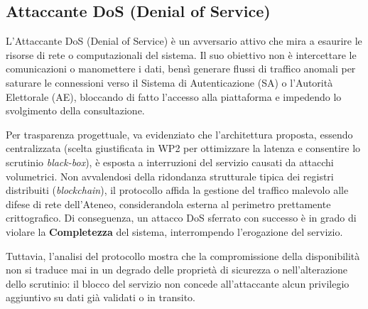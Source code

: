 \subsection{Attaccante DoS (Denial of Service)}
\label{subsec:3.2.2_dos}

L'Attaccante DoS (Denial of Service) è un avversario attivo che mira a esaurire le risorse di rete o computazionali del sistema. Il suo obiettivo non è intercettare le comunicazioni o manomettere i dati, bensì generare flussi di traffico anomali per saturare le connessioni verso il Sistema di Autenticazione (SA) o l'Autorità Elettorale (AE), bloccando di fatto l'accesso alla piattaforma e impedendo lo svolgimento della consultazione.

Per trasparenza progettuale, va evidenziato che l'architettura proposta, essendo centralizzata (scelta giustificata in WP2 per ottimizzare la latenza e consentire lo scrutinio \textit{black-box}), è esposta a interruzioni del servizio causati da attacchi volumetrici. Non avvalendosi della ridondanza strutturale tipica dei registri distribuiti (\textit{blockchain}), il protocollo affida la gestione del traffico malevolo alle difese di rete dell'Ateneo, considerandola esterna al perimetro prettamente crittografico. Di conseguenza, un attacco DoS sferrato con successo è in grado di violare la \textbf{Completezza} del sistema, interrompendo l'erogazione del servizio.

Tuttavia, l'analisi del protocollo mostra che la compromissione della disponibilità non si traduce mai in un degrado delle proprietà di sicurezza o nell'alterazione dello scrutinio: il blocco del servizio non concede all'attaccante alcun privilegio aggiuntivo su dati già validati o in transito.

